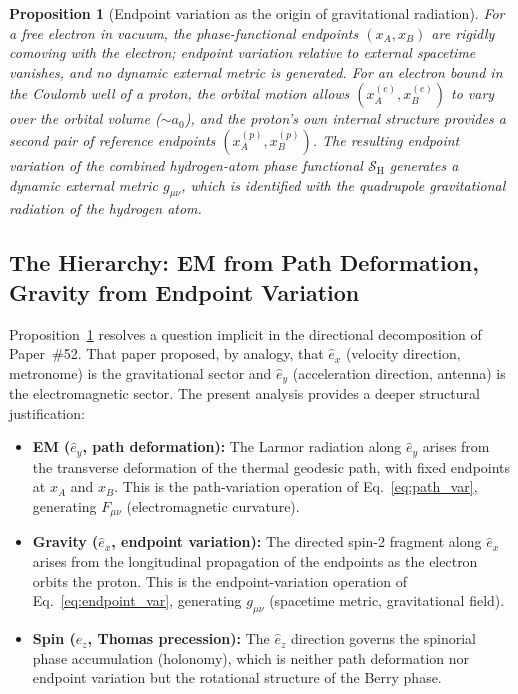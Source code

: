 \documentclass[%
 reprint, amsmath,amssymb, aps, prd, ]{revtex4-2}
\numberwithin{equation}{section}
\newtheorem{proposition}[theorem]{Proposition}
\newcommand{\ehat}[1]{\hat{e}_{#1}}
\begin{document}
\begin{proposition}[Endpoint variation as the origin of gravitational radiation]
\label{prop:endpoint}
For a free electron in vacuum, the phase-functional endpoints $(x_A, x_B)$ are rigidly comoving with the electron; endpoint variation relative to external spacetime vanishes, and no dynamic external metric is generated.
For an electron bound in the Coulomb well of a proton, the orbital motion allows $(x_A^{(e)}, x_B^{(e)})$ to vary over the orbital volume ($\sim a_0$), and the proton's own internal structure provides a second pair of reference endpoints $(x_A^{(p)}, x_B^{(p)})$.
The resulting endpoint variation of the combined hydrogen-atom phase functional $\mathcal{S}_\mathrm{H}$ generates a dynamic external metric $g_{\mu\nu}$, which is identified with the quadrupole gravitational radiation of the hydrogen atom.
\end{proposition}

\subsection{The Hierarchy: EM from Path Deformation, Gravity from Endpoint Variation}

Proposition~\ref{prop:endpoint} resolves a question implicit in the directional decomposition of Paper~\#52.
That paper proposed, by analogy, that $\ehat{x}$ (velocity direction, metronome) is the gravitational sector and $\ehat{y}$ (acceleration direction, antenna) is the electromagnetic sector.
The present analysis provides a deeper structural justification:
\begin{itemize}[leftmargin=2em, itemsep=4pt]
\item \textbf{EM ($\ehat{y}$, path deformation):} The Larmor radiation along $\ehat{y}$ arises from the transverse deformation of the thermal geodesic path, with fixed endpoints at $x_A$ and $x_B$. This is the path-variation operation of Eq.~\eqref{eq:path_var}, generating $F_{\mu\nu}$ (electromagnetic curvature).
\item \textbf{Gravity ($\ehat{x}$, endpoint variation):} The directed spin-2 fragment along $\ehat{x}$ arises from the longitudinal propagation of the endpoints as the electron orbits the proton. This is the endpoint-variation operation of Eq.~\eqref{eq:endpoint_var}, generating $g_{\mu\nu}$ (spacetime metric, gravitational field).
\item \textbf{Spin ($\ehat{z}$, Thomas precession):} The $\ehat{z}$ direction governs the spinorial phase accumulation (holonomy), which is neither path deformation nor endpoint variation but the rotational structure of the Berry phase.
\end{itemize}
\end{document}

